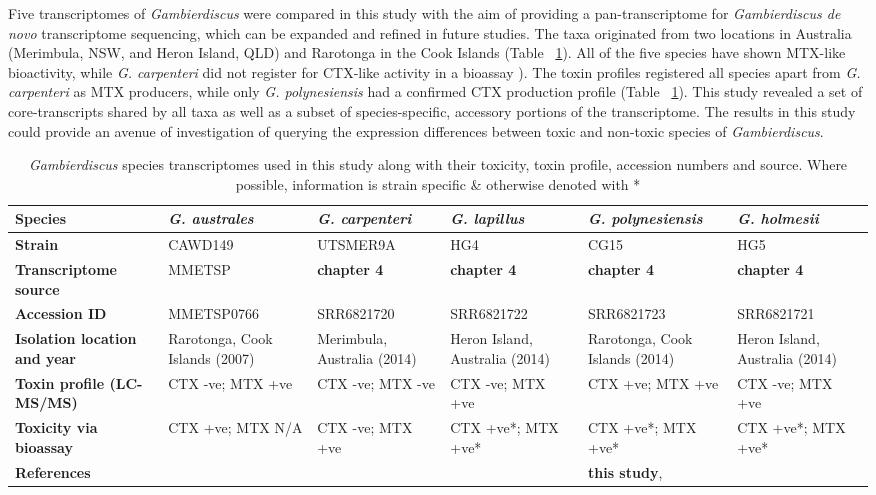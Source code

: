 \documentclass[12pt]{article}
\begin{document}
Five transcriptomes of \textit{Gambierdiscus} were compared in this study with the aim of providing a pan-transcriptome for \textit{Gambierdiscus de novo} transcriptome sequencing, which can be expanded and refined in future studies. 
The taxa originated from two locations in Australia (Merimbula, NSW, and Heron Island, QLD) and Rarotonga in the Cook Islands (Table ~\ref{tbl:StrainTable}). 
All of the five species have shown MTX-like bioactivity, while \textit{G. carpenteri} did not register for CTX-like activity in a bioassay \cite{larsson2018toxicology}). 
The toxin profiles registered all species apart from \textit{G. carpenteri} as MTX producers, while only \textit{G. polynesiensis} had a confirmed CTX production profile (Table ~\ref{tbl:StrainTable}).
This study revealed a set of core-transcripts shared by all taxa as  well as a subset of species-specific, accessory portions of the transcriptome. 
The results in this study could provide an avenue of investigation of querying the expression differences between toxic and non-toxic species of \textit{Gambierdiscus}.

\FloatBarrier
\begin{table}
\caption{\emph{Gambierdiscus} species transcriptomes used in this study along with their toxicity, toxin profile, accession numbers and source. Where possible, information is strain specific \& otherwise denoted with *}
\label{tbl:StrainTable}
\begin{tabular}{ | p{2.5cm} | p{2.3cm} | p{2.3cm} | p{2.3cm} | p{2.3cm} | p{2.3cm}|}
\hline
\textbf{Species}&\textit{G. australes}&\textit{G. carpenteri}&\textit{G. lapillus}&\textit{G. polynesiensis}&\textit{G. holmesii}\\
\hline
\textbf{Strain}&CAWD149&UTSMER9A&HG4&CG15&HG5\\
\hline
\textbf{Transcriptome source}&MMETSP&\textbf{chapter 4}&\textbf{chapter 4}&\textbf{chapter 4}&\textbf{chapter 4}\\
\hline
\textbf{Accession ID}&MMETSP0766&SRR6821720&SRR6821722&SRR6821723&SRR6821721\\
\hline
\textbf{Isolation location and year}&Rarotonga, Cook Islands (2007)&Merimbula, Australia (2014)&Heron Island, Australia (2014)&Rarotonga, Cook Islands (2014)&Heron Island, Australia (2014)\\
\hline
\textbf{Toxin profile (LC-MS/MS)}&CTX -ve; MTX +ve&CTX -ve; MTX -ve&CTX -ve; MTX +ve&CTX +ve; MTX +ve&CTX -ve; MTX +ve\\
\hline
\textbf{Toxicity via bioassay}&CTX +ve; MTX N/A&CTX -ve; MTX +ve&CTX +ve*; MTX +ve*&CTX +ve*; MTX +ve*&CTX +ve*; MTX +ve*\\
\hline
\textbf{References}&\cite{keeling2014marine,rhodes2010toxic,munday2017ciguatoxins}&\cite{larsson2018toxicology}&\cite{larsson2018toxicology,kretzschmar2017characterization}&\textbf{this study}, \cite{chinain2010growth}&\cite{larsson2018toxicology,kretzschmar2017characterization}\\
\hline
\end{tabular}
\end{table}
\FloatBarrier
\newpage
\end{document}
